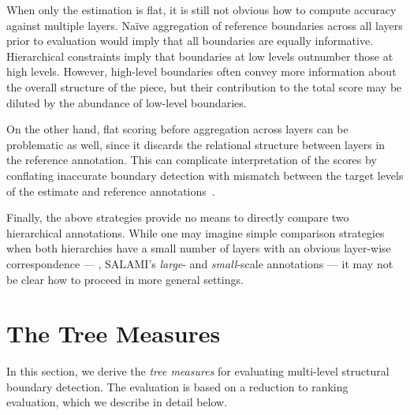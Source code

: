 \documentclass{article}
\begin{document}
When only the estimation is flat, it is still not obvious how to compute accuracy against multiple layers.
Na\"ive aggregation of reference boundaries across all layers prior to evaluation would imply 
that all boundaries are equally informative.
Hierarchical constraints imply that boundaries at low levels outnumber those at high levels.
However, high-level boundaries often convey more information about the overall structure of the piece, but
their contribution to the total score may be diluted by the abundance of low-level boundaries.

On the other hand, flat scoring before aggregation across layers can be problematic as well, 
since it discards the relational structure between layers in the reference annotation.
This can complicate interpretation of the scores by conflating inaccurate boundary detection
with mismatch between the target levels of the estimate and reference annotations~\cite{Smith2013}.

Finally, the above strategies provide no means to directly compare two hierarchical annotations.
While one may imagine simple comparison strategies when both hierarchies have a small
number of layers with an obvious layer-wise correspondence 
--- \eg, SALAMI's \emph{large}- and \emph{small}-scale annotations --- it may not be clear how to proceed in
more general settings.



\section{The Tree Measures}\label{sec:eval_desc}
\sloppy
In this section, we derive the \emph{tree measures} for evaluating multi-level structural boundary detection.
The evaluation is based on a reduction to ranking evaluation, which we describe in detail below.
\end{document}
